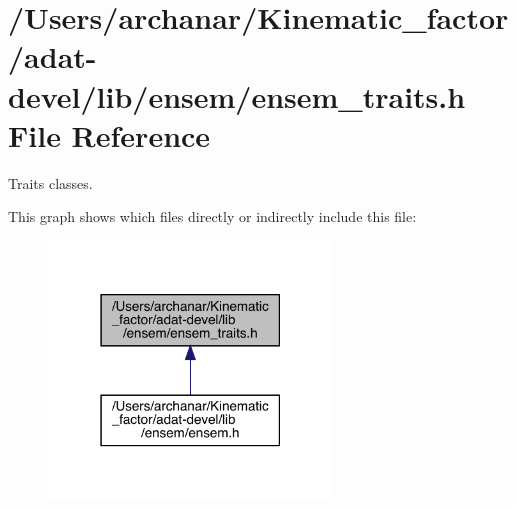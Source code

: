\hypertarget{adat-devel_2lib_2ensem_2ensem__traits_8h}{}\section{/\+Users/archanar/\+Kinematic\+\_\+factor/adat-\/devel/lib/ensem/ensem\+\_\+traits.h File Reference}
\label{adat-devel_2lib_2ensem_2ensem__traits_8h}


Traits classes.  


This graph shows which files directly or indirectly include this file\+:
\nopagebreak
\begin{figure}[H]
\begin{center}
\leavevmode
\includegraphics[width=214pt]{db/d52/adat-devel_2lib_2ensem_2ensem__traits_8h__dep__incl}
\end{center}
\end{figure}
